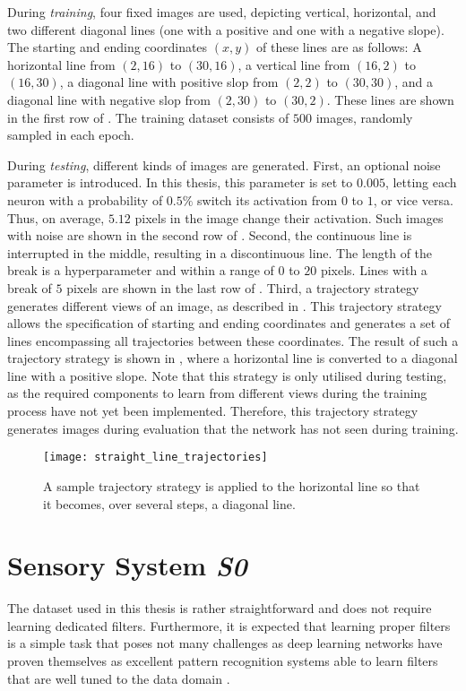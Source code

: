 During \emph{training}, four fixed images are used, depicting vertical, horizontal, and two different diagonal lines (one with a positive and one with a negative slope). The starting and ending coordinates $(x, y)$ of these lines are as follows: A horizontal line from $(2, 16)$ to $(30, 16)$, a vertical line from $(16, 2)$ to $(16, 30)$, a diagonal line with positive slop from $(2, 2)$ to $(30, 30)$, and a diagonal line with negative slop from $(2, 30)$ to $(30, 2)$. These lines are shown in the first row of .
The training dataset consists of $500$ images, randomly sampled in each epoch.

During \emph{testing}, different kinds of images are generated. 
First, an optional noise parameter is introduced. In this thesis, this parameter is set to $0.005$, letting each neuron with a probability of $0.5\%$ switch its activation from $0$ to $1$, or vice versa. Thus, on average, $5.12$ pixels in the image change their activation. Such images with noise are shown in the second row of .
Second, the continuous line is interrupted in the middle, resulting in a discontinuous line. The length of the break is a hyperparameter and within a range of $0$ to $20$ pixels. Lines with a break of $5$ pixels are shown in the last row of .
Third, a trajectory strategy generates different views of an image, as described in . This trajectory strategy allows the specification of starting and ending coordinates and generates a set of lines encompassing all trajectories between these coordinates.
The result of such a trajectory strategy is shown in , where a horizontal line is converted to a diagonal line with a positive slope. Note that this strategy is only utilised during testing, as the required components to learn from different views during the training process have not yet been implemented. Therefore, this trajectory strategy generates images during evaluation that the network has not seen during training. 

\begin{figure}[h]
    \centering
    \texttt{[image: straight\_line\_trajectories]}
    \caption[Sample line trajectory strategy]{A sample trajectory strategy is applied to the horizontal line so that it becomes, over several steps, a diagonal line.}
\end{figure}


\section{Sensory System \emph{S0}}
The dataset used in this thesis is rather straightforward and does not require learning dedicated filters.
Furthermore, it is expected that learning proper filters is a simple task that poses not many challenges as deep learning networks have proven themselves as excellent pattern recognition systems able to learn filters that are well tuned to the data domain .


